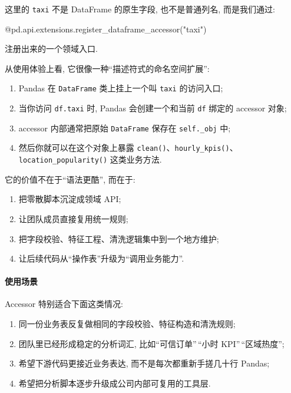 \documentclass[11pt]{article}
\providecommand{\tightlist}{%
      \setlength{\itemsep}{0pt}\setlength{\parskip}{0pt}}
\newenvironment{Shaded}{}{}
\newcommand{\StringTok}[1]{\textcolor[rgb]{0.25,0.44,0.63}{{#1}}}
\newcommand{\NormalTok}[1]{{#1}}
\newcommand{\AttributeTok}[1]{\textcolor[rgb]{0.49,0.56,0.16}{{#1}}}
\begin{document}
这里的 \texttt{taxi} 不是 DataFrame 的原生字段, 也不是普通列名,
而是我们通过:

\begin{Shaded}
\begin{Highlighting}[]
\AttributeTok{@pd.api.extensions.register\_dataframe\_accessor}\NormalTok{(}\StringTok{"taxi"}\NormalTok{)}
\end{Highlighting}
\end{Shaded}

注册出来的一个领域入口.

从使用体验上看, 它很像一种``描述符式的命名空间扩展'':

\begin{enumerate}
\def\labelenumi{\arabic{enumi}.}
\tightlist
\item
  Pandas 在 \texttt{DataFrame} 类上挂上一个叫 \texttt{taxi} 的访问入口;
\item
  当你访问 \texttt{df.taxi} 时, Pandas 会创建一个和当前 \texttt{df}
  绑定的 accessor 对象;
\item
  accessor 内部通常把原始 \texttt{DataFrame} 保存在 \texttt{self.\_obj}
  中;
\item
  然后你就可以在这个对象上暴露
  \texttt{clean()}、\texttt{hourly\_kpis()}、\texttt{location\_popularity()}
  这类业务方法.
\end{enumerate}

它的价值不在于``语法更酷'', 而在于:

\begin{enumerate}
\def\labelenumi{\arabic{enumi}.}
\tightlist
\item
  把零散脚本沉淀成领域 API;
\item
  让团队成员直接复用统一规则;
\item
  把字段校验、特征工程、清洗逻辑集中到一个地方维护;
\item
  让后续代码从``操作表''升级为``调用业务能力''.
\end{enumerate}

    \paragraph{使用场景}\label{ux4f7fux7528ux573aux666f}

    Accessor 特别适合下面这类情况:

\begin{enumerate}
\def\labelenumi{\arabic{enumi}.}
\tightlist
\item
  同一份业务表反复做相同的字段校验、特征构造和清洗规则;
\item
  团队里已经形成稳定的分析词汇, 比如``可信订单''\,``小时
  KPI''\,``区域热度'';
\item
  希望下游代码更接近业务表达, 而不是每次都重新手搓几十行 Pandas;
\item
  希望把分析脚本逐步升级成公司内部可复用的工具层.
\end{enumerate}
\end{document}
